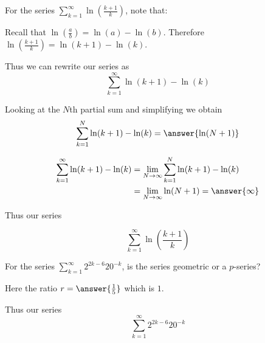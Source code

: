 \documentclass{ximera}
\begin{document}
\begin{exercise}
\begin{hint}
\begin{question}
For the series $\sum_{k=1}^{\infty} \ln\left(\frac{k+1}{k}\right)$, note that:

\begin{multipleChoice}
\end{multipleChoice}

Recall that $\ln \left(\frac{a}{b}\right)=\ln(a)-\ln(b)$. Therefore $\ln\left(\frac{k+1}{k}\right)=\ln(k+1)-\ln(k)$. 

Thus we can rewrite our series as 
\[
\sum^{\infty}_{k=1} \ln(k+1)-\ln(k)
\]


Looking at the $N$th partial sum and simplifying we obtain 
\[
\sum^{N}_{k=1} \ln(k+1)-\ln(k)=\answer{\ln(N+1)}
\]

\begin{align*}
\sum^{\infty}_{k=1} \ln(k+1)-\ln(k)&=\lim_{N \to \infty} \sum^{N}_{k=1} \ln(k+1)-\ln(k) \\
&=\lim_{N \to \infty} \ln(N+1)=\answer{\infty}
\end{align*}

Thus our series

\[
\sum^{\infty}_{k=1} \ln\left(\frac{k+1}{k}\right)
\]

\begin{multipleChoice}
\end{multipleChoice}


\end{question}

\begin{question}
For the series $\sum_{k=1}^{\infty} 2^{2k-6}20^{-k}$, is the series geometric or a $p$-series?

\begin{multipleChoice}
\end{multipleChoice}

Here the ratio $r= \answer{\frac{1}{5}}$ which is  $1$. 

Thus our series
\[
\sum_{k=1}^{\infty} 2^{2k-6}20^{-k}
\]


\end{question}
\end{hint}
\end{exercise}
\end{document}
